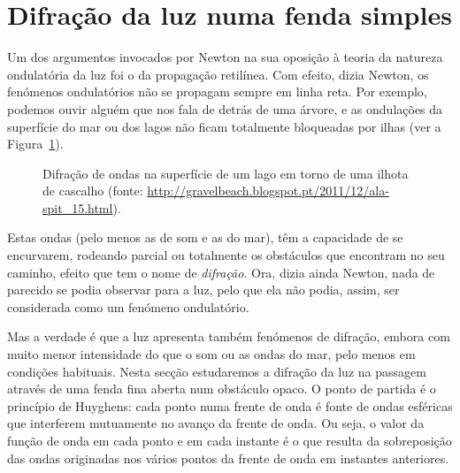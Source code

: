 \section{Difração da luz numa fenda simples}
Um dos argumentos invocados por Newton na sua oposição à teoria da natureza
ondulatória da luz foi o da propagação retilínea. Com efeito, dizia Newton, os
fenómenos ondulatórios não se propagam sempre em linha reta. Por exemplo,
podemos ouvir alguém que nos fala de detrás de uma árvore, e as ondulações da
superfície do mar ou dos lagos não ficam totalmente bloqueadas por ilhas (ver a
Figura~\ref{fig:oof100}).
\begin{figure}[htb]
    \begin{center}
        \caption{Difração de ondas na superfície de um lago em torno de
            uma ilhota de cascalho (fonte:
            \protect\url{http://gravelbeach.blogspot.pt/2011/12/ala-spit_15.html}).
        \label{fig:oof100} }
\end{center}
\end{figure}
Estas ondas (pelo menos as de
som e as do mar), têm a capacidade de se encurvarem, rodeando parcial ou
totalmente os obstáculos que encontram no seu caminho, efeito que tem o nome de
\emph{difração}. Ora, dizia ainda Newton, nada de parecido se podia observar
para a luz, pelo que ela não podia, assim, ser considerada como um fenómeno
ondulatório. 

Mas a verdade é que a luz apresenta também fenómenos de difração, embora com
muito menor intensidade do que o som ou as ondas do mar, pelo menos em condições
habituais. Nesta secção estudaremos a difração da luz na passagem através de uma
fenda fina aberta num obstáculo opaco. O ponto de partida é o princípio de
Huyghens: cada ponto numa frente de onda é fonte de ondas esféricas que
interferem mutuamente no avanço da frente de onda. Ou seja, o valor da função de
onda em cada ponto e em cada instante é o que resulta da sobreposição das ondas
originadas nos vários pontos da frente de onda em instantes anteriores.

